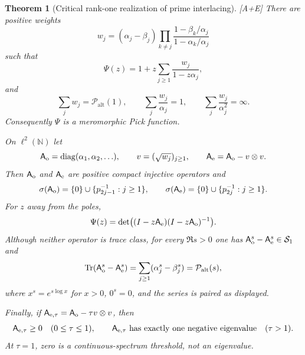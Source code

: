 \documentclass[11pt]{article}
\newtheorem{theorem}{Theorem}[section]
\theoremstyle{definition}
\theoremstyle{remark}
\newcommand{\Palt}{\mathcal P_{\mathrm{alt}}}
\newcommand{\status}[1]{\textnormal{\textcolor{accent}{\footnotesize[#1]}}}
\DeclareMathOperator{\Tr}{Tr}
\begin{document}
\begin{theorem}[Critical rank-one realization of prime interlacing]
\label{thm:prime-rank-one}
\status{A+E}
There are positive weights
\begin{equation}\label{eq:prime-rank-one-weights}
 w_j=(\alpha_j-\beta_j)
 \prod_{k\ne j}\frac{1-\beta_k/\alpha_j}{1-\alpha_k/\alpha_j}
\end{equation}
such that
\begin{equation}\label{eq:prime-pick-expansion}
 \Psi(z)=1+z\sum_{j\ge1}\frac{w_j}{1-z\alpha_j},
\end{equation}
and
\begin{equation}\label{eq:critical-weight-sums}
 \sum_jw_j=\Palt(1),\qquad
 \sum_j\frac{w_j}{\alpha_j}=1,
 \qquad
 \sum_j\frac{w_j}{\alpha_j^2}=\infty.
\end{equation}
Consequently $\Psi$ is a meromorphic Pick function.

On $\ell^2(\mathbb N)$ let
\[
 \mathsf A_{\rm o}=\operatorname{diag}(\alpha_1,\alpha_2,\ldots),\qquad
 v=(\sqrt{w_j})_{j\ge1},\qquad
 \mathsf A_{\rm e}=\mathsf A_{\rm o}-v\otimes v.
\]
Then $\mathsf A_{\rm o}$ and $\mathsf A_{\rm e}$ are positive compact injective
operators and
\begin{equation}\label{eq:prime-rank-one-spectra}
 \sigma(\mathsf A_{\rm o})=\{0\}\cup\{p_{2j-1}^{-1}:j\ge1\},\qquad
 \sigma(\mathsf A_{\rm e})=\{0\}\cup\{p_{2j}^{-1}:j\ge1\}.
\end{equation}
For $z$ away from the poles,
\begin{equation}\label{eq:prime-relative-determinant}
 \Psi(z)=\det\bigl((I-z\mathsf A_{\rm e})(I-z\mathsf A_{\rm o})^{-1}\bigr).
\end{equation}
Although neither operator is trace class, for every $\Re s>0$ one has
$\mathsf A_{\rm o}^s-\mathsf A_{\rm e}^s\in\mathcal S_1$ and
\begin{equation}\label{eq:prime-relative-trace}
 \Tr(\mathsf A_{\rm o}^s-\mathsf A_{\rm e}^s)
 =\sum_{j\ge1}(\alpha_j^s-\beta_j^s)=\Palt(s),
\end{equation}
where $x^s=e^{s\log x}$ for $x>0$, $0^s=0$, and the series is paired as displayed.

Finally, if $\mathsf A_{{\rm e},\tau}=\mathsf A_{\rm o}-\tau v\otimes v$, then
\begin{equation}\label{eq:critical-coupling}
 \mathsf A_{{\rm e},\tau}\ge0\quad(0\le\tau\le1),
 \qquad
 \mathsf A_{{\rm e},\tau}\text{ has exactly one negative eigenvalue}\quad(\tau>1).
\end{equation}
At $\tau=1$, zero is a continuous-spectrum threshold, not an eigenvalue.
\end{theorem}
\end{document}
